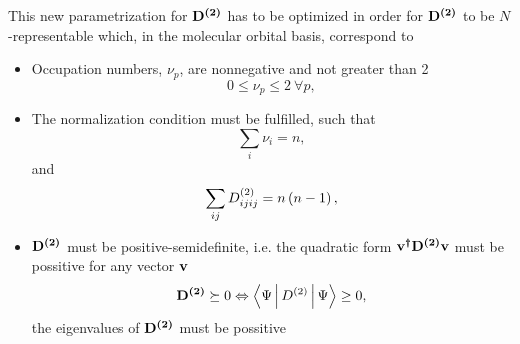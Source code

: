This new parametrization for $\boldsymbol{\mathrm{D^{\left( 2 \right)}}}$ has to be optimized in order for
$\boldsymbol{\mathrm{D^{\left( 2 \right)}}}$ to be $N$-representable which, in the molecular
orbital basis, correspond to
\begin{itemize}
    \item Occupation numbers, $\nu_p$, are nonnegative and not greater than 2 
    \begin{equation}
        0 \le \nu_p \le 2\ \forall p,
    \end{equation}

    \item The normalization condition must be fulfilled, such that 
    \begin{equation}
        \sum_{i} \nu_i = n,
    \end{equation}
    and 
    \begin{equation}
        \sum_{ij} D^{\left( 2 \right)}_{ijij} = n\left( n-1 \right), 
    \end{equation}

    \item $\boldsymbol{\mathrm{D^{\left( 2 \right)}}}$ must be positive-semidefinite, i.e. the quadratic form
        $\boldsymbol{\mathrm{v^{\dagger} D^{\left( 2 \right)} v}}$ must be possitive for any vector $\boldsymbol{\mathrm{v}}$
        \begin{equation}
            \mat{\tedm} \succeq 0 \Leftrightarrow \Braket{\Psi | \tedm | \Psi} \ge 0,
        \end{equation}
        the eigenvalues of $\boldsymbol{\mathrm{D^{\left( 2 \right)}}}$ must be possitive

\end{itemize}

